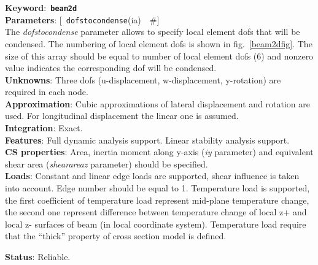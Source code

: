 \documentclass[a4paper]{article}
\newcommand{\descitem}[1]{{\noindent \bf #1}:}
\newcommand{\elemkeyword}[1]{\descitem{Keyword}~{\bf \texttt{#1}}}
\newcommand{\elemparam}[2]{{{\texttt{#1}\tiny (#2)}~~\#}}
\newcommand{\optelemparam}[2]{{[~\elemparam{#1}{#2}]}}
\newcommand{\param}[1]{{\em #1}}
\begin{document}
\elemkeyword{beam2d}\\
\descitem{Parameters} \optelemparam{dofstocondense}{ia}\\
The \param{dofstocondense} parameter allows to specify local element dofs that
will be condensed. The numbering of local element dofs is shown in
fig.~\ref{beam2dfig}. The size of this array should be equal to
number of local element dofs (6) and nonzero value indicates the
corresponding dof will be condensed.\\
\descitem{Unknowns}
Three dofs (u-displacement, w-displacement, y-rotation) are required
in each node.\\
\descitem{Approximation} Cubic  approximations of lateral displacement and
rotation are used. For longitudinal displacement the linear one is
assumed.\\
\descitem{Integration} Exact.\\
\descitem{Features} Full dynamic analysis support. Linear stability
analysis support.\\
\descitem{CS properties} Area,
inertia moment along y-axis (\param{iy} parameter) and equivalent shear area (\param{shearareaz} parameter) should be specified.\\ 
\descitem{Loads}  Constant and linear edge loads are supported, shear
influence is taken into account. 
Edge number should be equal to 1. Temperature load is
supported, the first coefficient of temperature load represent
mid-plane temperature change, the second one represent difference
between temperature change of local z+ and local z- surfaces of beam (in local coordinate
system). Temperature load require that the ``thick'' property of cross
section model is defined.

\descitem{Status} Reliable.
\end{document}
